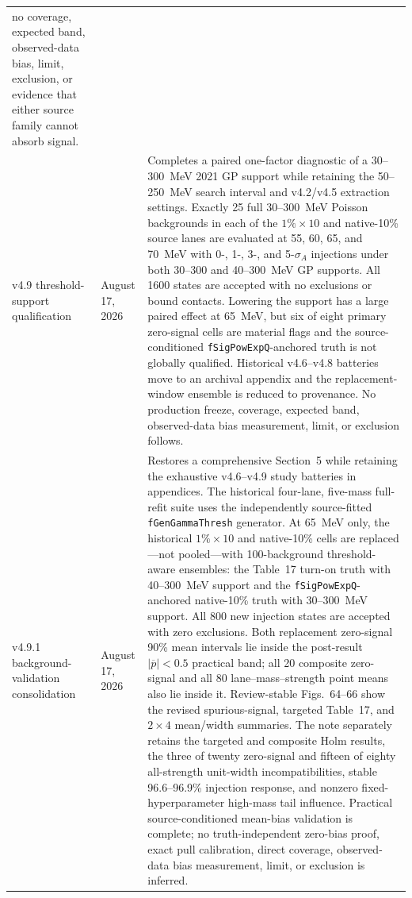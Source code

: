 \begin{longtable}{P{0.11\textwidth}P{0.16\textwidth}P{0.64\textwidth}}
no coverage, expected band, observed-data bias, limit, exclusion, or evidence
that either source family cannot absorb signal. \\
\addlinespace
v4.9 threshold-support qualification & August 17, 2026 &
Completes a paired one-factor diagnostic of a 30--300~MeV 2021 GP support while
retaining the 50--250~MeV search interval and v4.2/v4.5 extraction settings.  Exactly
25 full 30--300~MeV Poisson backgrounds in each of the $1\%\times10$ and native-10\%
source lanes are evaluated at 55, 60, 65, and 70~MeV with 0-, 1-, 3-, and
5-$\sigma_A$ injections under both 30--300 and 40--300~MeV GP supports.  All 1600
states are accepted with no exclusions or bound contacts.  Lowering the support has a
large paired effect at 65~MeV, but six of eight primary zero-signal cells are material
flags and the source-conditioned \texttt{fSigPowExpQ}-anchored truth is not globally
qualified.  Historical v4.6--v4.8 batteries move to an archival appendix and the
replacement-window ensemble is reduced to provenance.  No production freeze,
coverage, expected band, observed-data bias measurement, limit, or exclusion follows. \\
\addlinespace
v4.9.1 background-validation consolidation & August 17, 2026 &
Restores a comprehensive Section~5 while retaining the exhaustive v4.6--v4.9 study
batteries in appendices.  The historical four-lane, five-mass full-refit suite uses
the independently source-fitted \texttt{fGenGammaThresh} generator.  At 65~MeV only,
the historical $1\%\times10$ and native-10\% cells are replaced---not pooled---with
100-background threshold-aware ensembles: the Table~17 turn-on truth with 40--300~MeV
support and the \texttt{fSigPowExpQ}-anchored native-10\% truth with 30--300~MeV
support.  All 800 new injection states are accepted with zero exclusions.  Both
replacement zero-signal 90\% mean intervals lie inside the post-result
$|\overline p|<0.5$ practical band; all 20 composite zero-signal and all 80
lane--mass--strength point means also lie inside it.  Review-stable Figs.~64--66 show
the revised spurious-signal, targeted Table~17, and $2\times4$ mean/width summaries.
The note separately retains the targeted and composite Holm results, the three of
twenty zero-signal and fifteen of eighty all-strength unit-width incompatibilities,
stable 96.6--96.9\% injection response, and nonzero fixed-hyperparameter high-mass
tail influence.  Practical source-conditioned mean-bias validation is complete; no
truth-independent zero-bias proof, exact pull calibration, direct coverage,
observed-data bias measurement, limit, or exclusion is inferred. \\

\end{longtable}
